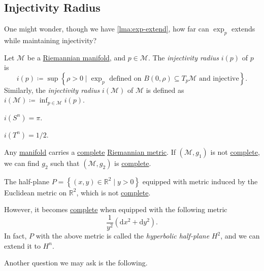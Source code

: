 \subsection{Injectivity Radius}
One might wonder, though we have \autoref{lma:exp-extend}, how far can \(\exp _p\) extends while maintaining injectivity?

\begin{definition}\label{def:injectivity-radius}
	Let \(\mathcal{M} \) be a \hyperref[def:Riemannian-manifold]{Riemannian manifold}, and \(p\in \mathcal{M} \). The \emph{injectivity radius} \(i(p)\) of \(p\) is
	\[
		i(p) \coloneqq \sup \left\{ \rho > 0 \mid \exp _p \text{ defined on \(B(0, \rho ) \subseteq T_p \mathcal{M} \) and injective} \right\}.
	\]
	Similarly, the \emph{injectivity radius} \(i(\mathcal{M} )\) of \(\mathcal{M} \) is defined as \(i(\mathcal{M} )\coloneqq \inf _{p\in \mathcal{M} }i(p)\).
\end{definition}

\begin{eg}[Sphere]
	\(i(S^n) = \pi \).
\end{eg}

\begin{eg}[Torus]
	\(i(T^n) = 1 / 2\).
\end{eg}

\begin{remark}
	Any \hyperref[def:smooth-manifold]{manifold} carries a \hyperref[def:geodesically-complete]{complete} \hyperref[def:Riemannian-metric]{Riemannian metric}. If \((\mathcal{M} , g_1)\) is not \hyperref[def:geodesically-complete]{complete}, we can find \(g_2\) such that \((\mathcal{M} , g_2)\) is \hyperref[def:geodesically-complete]{complete}.
\end{remark}

\begin{eg}
	The half-plane \(P=\left\{ (x, y)\in \mathbb{R} ^2 \mid y > 0 \right\}\) equipped with metric induced by the Euclidean metric on \(\mathbb{R} ^2\), which is not \hyperref[def:geodesically-complete]{complete}.

	However, it becomes \hyperref[def:geodesically-complete]{complete} when equipped with the following metric
	\[
		\frac{1}{y^2} (\mathrm{d} x^2 + \mathrm{d} y^2).
	\]
	In fact, \(P\) with the above metric is called the \emph{hyperbolic half-plane} \(H^2\), and we can extend it to \(H^n \).
\end{eg}

Another question we may ask is the following.

